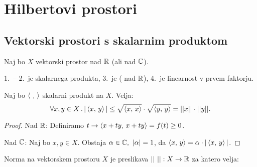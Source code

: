 \section{Hilbertovi prostori}
\subsection{Vektorski prostori s skalarnim produktom}
Naj bo \(X\) vektorski prostor nad \(\mathbb{R}\) (ali nad \(\mathbb{C}\)).

\begin{opomba}
    1.\ -- 2.\ je  skalarnega produkta, 3.\ je  ( nad \(\mathbb{R}\)), 4.\ je linearnost v prvem faktorju.
\end{opomba}

\begin{trditev}
    Naj bo \(\left\langle \ , \,  \right\rangle\) skalarni produkt na \(X\). Velja: 
    \[\forall x,y \in X \,.\, |\left\langle x, \, y \right\rangle| \leq \sqrt{\left\langle x, \, x \right\rangle} \cdot \sqrt{\left\langle y, \, y \right\rangle} = ||x|| \cdot ||y||.\]
\end{trditev}

\begin{proof}
    Nad \(\mathbb{R}\): Definiramo \(t \to \left\langle x + ty, \, x + ty \right\rangle = f(t) \geq 0\).

    Nad \(\mathbb{C}\): Naj bo \(x, y \in X\). Obstaja \(\alpha \in \mathbb{C}, \ |\alpha| = 1\), da \(\left\langle x, \, y \right\rangle = \alpha \cdot |\left\langle x, \, y \right\rangle|\).
\end{proof}

\begin{definicija}
    Norma na vektorskem prostoru \(X\) je preslikava \(||\ ||: X \to \mathbb{R}\) za katero velja:
\end{definicija}

